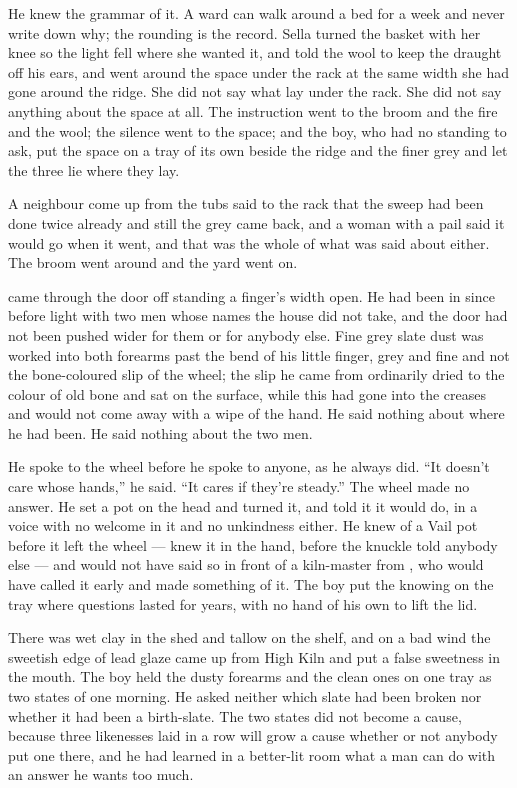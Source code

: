 He knew the grammar of it. A ward can walk around a bed for a week and never write down why; the rounding is the record. Sella turned the basket with her knee so the light fell where she wanted it, and told the wool to keep the draught off his ears, and went around the space under the rack at the same width she had gone around the ridge. She did not say what lay under the rack. She did not say anything about the space at all. The instruction went to the broom and the fire and the wool; the silence went to the space; and the boy, who had no standing to ask, put the space on a tray of its own beside the ridge and the finer grey and let the three lie where they lay.

A neighbour come up from the tubs said to the rack that the sweep had been done twice already and still the grey came back, and a woman with a pail said it would go when it went, and that was the whole of what was said about either. The broom went around and the yard went on.

\scenebreak

 came through the door off  standing a finger's width open. He had been in  since before light with two men whose names the house did not take, and the door had not been pushed wider for them or for anybody else. Fine grey slate dust was worked into both forearms past the bend of his little finger, grey and fine and not the bone-coloured slip of the wheel; the slip he came from ordinarily dried to the colour of old bone and sat on the surface, while this had gone into the creases and would not come away with a wipe of the hand. He said nothing about where he had been. He said nothing about the two men.

He spoke to the wheel before he spoke to anyone, as he always did. “It doesn't care whose hands,” he said. “It cares if they're steady.” The wheel made no answer. He set a pot on the head and turned it, and told it it would do, in a voice with no welcome in it and no unkindness either. He knew  of a Vail pot before it left the wheel --- knew it in the hand, before the knuckle told anybody else --- and would not have said so in front of a kiln-master from , who would have called it early and made something of it. The boy put the knowing on the tray where questions lasted for years, with no hand of his own to lift the lid.

There was wet clay in the shed and tallow on the shelf, and on a bad wind the sweetish edge of lead glaze came up from High Kiln and put a false sweetness in the mouth. The boy held the dusty forearms and the clean ones on one tray as two states of one morning. He asked neither which slate had been broken nor whether it had been a birth-slate. The two states did not become a cause, because three likenesses laid in a row will grow a cause whether or not anybody put one there, and he had learned in a better-lit room what a man can do with an answer he wants too much.

